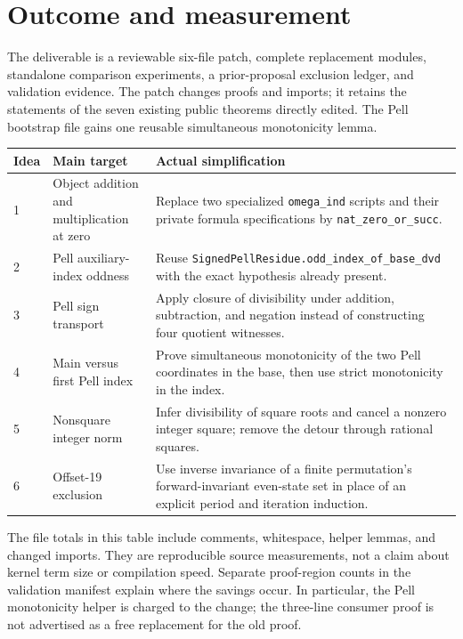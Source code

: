 \documentclass[11pt,letterpaper]{article}
\newcommand{\code}[1]{\nolinkurl{#1}}
\begin{document}
\section{Outcome and measurement}

The deliverable is a reviewable six-file patch, complete replacement modules,
standalone comparison experiments, a prior-proposal exclusion ledger, and
validation evidence. The patch changes proofs and imports; it retains the
statements of the seven existing public theorems directly edited. The Pell
bootstrap file gains one reusable simultaneous monotonicity lemma.

\begin{longtable}{@{}p{}>{\raggedright\arraybackslash}p{}>{\raggedright\arraybackslash}p{}@{}}
\toprule
Idea & Main target & Actual simplification \\
\midrule
\endhead
1 & Object addition and multiplication at zero & Replace two specialized
\code{omega_ind} scripts and their private formula specifications by
\code{nat_zero_or_succ}. \\
2 & Pell auxiliary-index oddness & Reuse
\code{SignedPellResidue.odd_index_of_base_dvd} with the exact hypothesis
already present. \\
3 & Pell sign transport & Apply closure of divisibility under addition,
subtraction, and negation instead of constructing four quotient witnesses. \\
4 & Main versus first Pell index & Prove simultaneous monotonicity of the two
Pell coordinates in the base, then use strict monotonicity in the index. \\
5 & Nonsquare integer norm & Infer divisibility of square roots and cancel a
nonzero integer square; remove the detour through rational squares. \\
6 & Offset-19 exclusion & Use inverse invariance of a finite permutation's
forward-invariant even-state set in place of an explicit period and iteration
induction. \\
\bottomrule
\end{longtable}



The file totals in this table include comments, whitespace, helper lemmas,
and changed imports. They are reproducible source measurements, not a claim
about kernel term size or compilation speed. Separate proof-region counts in
the validation manifest explain where the savings occur. In particular, the
Pell monotonicity helper is charged to the change; the three-line consumer
proof is not advertised as a free replacement for the old proof.
\end{document}
